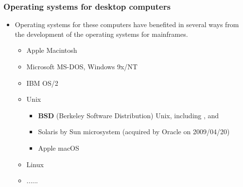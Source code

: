 \documentclass[CJKutf8,xcolor=pdftex,dvipsnames,table]{beamer}
\begin{document}
\begin{CJK*}{UTF8}{song}
  \begin{frame}
  \frametitle{Operating systems for desktop computers} \pause
	  \begin{itemize}
	  	\item{Operating systems for these computers have benefited in several ways from the development of the operating systems for mainframes.} \pause
	    \begin{itemize}
		    \item{Apple Macintosh} \pause
		    \item{Microsoft MS-DOS, Windows 9x/NT} \pause
		    \item{IBM OS/2} \pause
		    \item{Unix} \pause
		      \begin{itemize}
		      \item{\textbf{BSD} (Berkeley Software Distribution) Unix, including ,  and } \pause
		      \item{Solaris by Sun microsystem (acquired by Oracle on 2009/04/20)} \pause
		      \item{Apple macOS} \pause
		      \end{itemize}
			\item{Linux} \pause
		    \item{......}
	    \end{itemize}
	  \end{itemize}
  \end{frame}


\end{CJK*}
\end{document}
